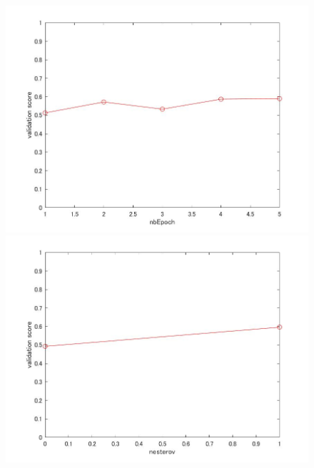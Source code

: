 \documentclass[a4j,11pt]{jarticle}
\begin{document}
\begin{figure}
	\begin{minipage}{0.50\hsize}
		\begin{center}
			\includegraphics[width=12cm, bb=0 0 875 656]{../matlab/fig/nbEpoch.jpg}
		\end{center}
	\end{minipage}
	\begin{minipage}{0.50\hsize}
		\begin{center}
			\includegraphics[width=12cm, bb=0 0 875 656]{../matlab/fig/nesterov.jpg}
		\end{center}
	\end{minipage}
	\\
	\begin{minipage}{0.50\hsize}
		\begin{center}

\end{center}
\end{minipage}
\end{figure}
\end{document}
